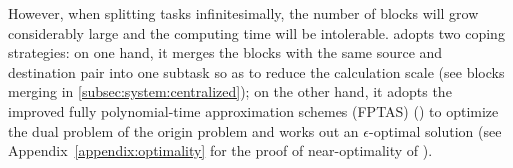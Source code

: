 However, when splitting tasks infinitesimally, the number of blocks will grow considerably large and the computing time will be intolerable. \name adopts two coping strategies: on one hand, it merges the blocks with the same source and destination pair into one subtask so as to reduce the calculation scale (see blocks merging in \Section\ref{subsec:system:centralized}); on the other hand, it adopts the improved fully polynomial-time approximation schemes (FPTAS) (\cite{fleischer2000approximating}) to optimize the dual problem of the origin problem and works out an $\epsilon$-optimal solution (see Appendix~\Section\ref{appendix:optimality} for the proof of near-optimality of \name).%

